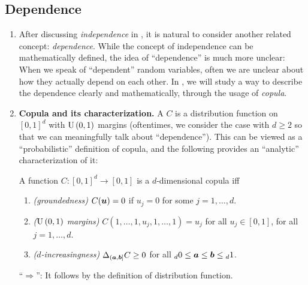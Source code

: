 \subsection{Dependence}
\label{subsect:dependence}
\begin{enumerate}
\item After discussing \emph{independence} in , it
is natural to consider another related concept: \emph{dependence}.  While the
concept of independence can be mathematically defined, the idea of
``dependence'' is much more unclear: When we speak of ``dependent'' random
variables, often we are unclear about how they actually depend on each other.
In , we will study a way to describe the dependence
clearly and mathematically, through the usage of \emph{copula}.
\item \textbf{Copula and its characterization.} A  \(C\) is a distribution function on \([0,1]^{d}\) with \(\operatorname{U}\left(0,1\right)\)
margins (oftentimes, we consider the case with \(d\ge 2\) so that we can
meaningfully talk about ``dependence''). This can be viewed as a
``probabilistic'' definition of copula, and the following provides an
``analytic'' characterization of it:
\begin{proposition}
\label{prp:copula-char}
A function \(C:[0,1]^{d}\to [0,1]\) is a \(d\)-dimensional copula iff
\begin{enumerate}[label={(\arabic*)}]
\item \emph{(groundedness)} \(C(\bm{u})=0\) if \(u_j=0\) for some \(j=1,\dotsc,d\).
\item \emph{(\(\operatorname{U}\left(0,1\right)\) margins)} \(C(1,\dotsc,1,u_j,1,\dotsc,1)=u_j\) for
all \(u_j\in [0,1]\), for all \(j=1,\dotsc,d\).
\item \emph{(\(d\)-increasingness)} \(\Delta_{(\bm{a},\bm{b}]}C\ge 0\) for
all \({}_{d}0\le\bm{a}\le\bm{b}\le{}_{d}1\).
\end{enumerate}
\end{proposition}
\begin{pf}
``\(\Rightarrow\)'': It follows by the definition of distribution function.


\end{pf}
\end{enumerate}

